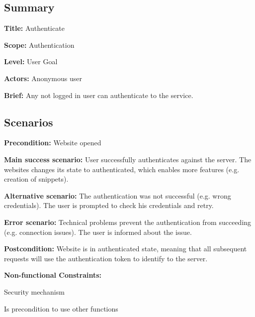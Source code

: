 \subsection*{Summary}


\begin{DoxyItemize}
\item {\bfseries Title\+:} Authenticate
\item {\bfseries Scope\+:} Authentication
\item {\bfseries Level\+:} User Goal
\item {\bfseries Actors\+:} Anonymous user
\item {\bfseries Brief\+:} Any not logged in user can authenticate to the service.
\end{DoxyItemize}

\subsection*{Scenarios}


\begin{DoxyItemize}
\item {\bfseries Precondition\+:} Website opened
\item {\bfseries Main success scenario\+:} User successfully authenticates against the server. The websites changes its state to authenticated, which enables more features (e.\+g. creation of snippets).
\item {\bfseries Alternative scenario\+:} The authentication was not successful (e.\+g. wrong credentials). The user is prompted to check his credentials and retry.
\item {\bfseries Error scenario\+:} Technical problems prevent the authentication from succeeding (e.\+g. connection issues). The user is informed about the issue.
\item {\bfseries Postcondition\+:} Website is in authenticated state, meaning that all subsequent requests will use the authentication token to identify to the server.
\item {\bfseries Non-\/functional Constraints\+:}
\begin{DoxyItemize}
\item Security mechanism
\item Is precondition to use other functions 
\end{DoxyItemize}
\end{DoxyItemize}